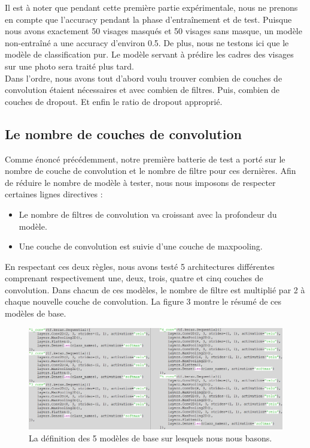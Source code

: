 \documentclass{article}
\begin{document}
Il est à noter que pendant cette première partie expérimentale, nous ne prenons en compte que l'accuracy pendant la phase d'entraînement et de test. Puisque nous avons exactement 50 visages masqués et 50 visages sans masque, un modèle non-entraîné a une accuracy d'environ 0.5. De plus, nous ne testons ici que le modèle de classification pur. Le modèle servant à prédire les cadres des visages sur une photo sera traité plus tard.\\
Dans l'ordre, nous avons tout d'abord voulu trouver combien de couches de convolution étaient nécessaires et avec combien de filtres. Puis, combien de couches de dropout. Et enfin le ratio de dropout approprié.\\

\subsection{Le nombre de couches de convolution}
Comme énoncé précédemment, notre première batterie de test a porté sur le nombre de couche de convolution et le nombre de filtre pour ces dernières. Afin de réduire le nombre de modèle à tester, nous nous imposons de respecter certaines lignes directives :
\begin{itemize}
  \item Le nombre de filtres de convolution va croissant avec la profondeur du modèle.
  \item Une couche de convolution est suivie d'une couche de maxpooling.\\
\end{itemize}

En respectant ces deux règles, nous avons testé 5 architectures différentes comprenant respectivement une, deux, trois, quatre et cinq couches de convolution. Dans chacun de ces modèles, le nombre de filtre est multiplié par 2 à chaque nouvelle couche de convolution. La figure 3 montre le résumé de ces modèles de base.
\begin{figure}[h]
\centering
\includegraphics[width=1.0\textwidth]{base_models.png}
\caption{\label{fig:Input}La définition des 5 modèles de base sur lesquels nous nous basons. \\}
\end{figure}
\end{document}
